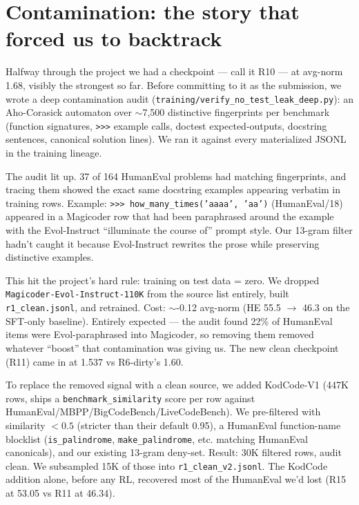 \documentclass[11pt]{article}
\begin{document}
\section{Contamination: the story that forced us to backtrack} \label{sec:contam}

Halfway through the project we had a checkpoint --- call it R10 --- at avg-norm 1.68, visibly the strongest so far. Before committing to it as the submission, we wrote a deep contamination audit (\texttt{training/verify\_no\_test\_leak\_deep.py}): an Aho-Corasick automaton over $\sim$7,500 distinctive fingerprints per benchmark (function signatures, \texttt{>>>} example calls, doctest expected-outputs, docstring sentences, canonical solution lines). We ran it against every materialized JSONL in the training lineage.

The audit lit up. 37 of 164 HumanEval problems had matching fingerprints, and tracing them showed the exact same docstring examples appearing verbatim in training rows. Example: \texttt{>>>\ how\_many\_times('aaaa', 'aa')} (HumanEval/18) appeared in a Magicoder row that had been paraphrased around the example with the Evol-Instruct ``illuminate the course of'' prompt style. Our 13-gram filter hadn't caught it because Evol-Instruct rewrites the prose while preserving distinctive examples.

This hit the project's hard rule: training on test data = zero. We dropped \texttt{Magicoder-Evol-Instruct-110K} from the source list entirely, built \texttt{r1\_clean.jsonl}, and retrained. Cost: $\sim$-0.12 avg-norm (HE 55.5 $\rightarrow$ 46.3 on the SFT-only baseline). Entirely expected --- the audit found 22\% of HumanEval items were Evol-paraphrased into Magicoder, so removing them removed whatever ``boost'' that contamination was giving us. The new clean checkpoint (R11) came in at 1.537 vs R6-dirty's 1.60.

To replace the removed signal with a clean source, we added KodCode-V1 (447K rows, ships a \texttt{benchmark\_similarity} score per row against HumanEval/MBPP/BigCodeBench/LiveCodeBench). We pre-filtered with similarity $<0.5$ (stricter than their default 0.95), a HumanEval function-name blocklist (\texttt{is\_palindrome}, \texttt{make\_palindrome}, etc. matching HumanEval canonicals), and our existing 13-gram deny-set. Result: 30K filtered rows, audit clean. We subsampled 15K of those into \texttt{r1\_clean\_v2.jsonl}. The KodCode addition alone, before any RL, recovered most of the HumanEval we'd lost (R15 at 53.05 vs R11 at 46.34).
\end{document}
